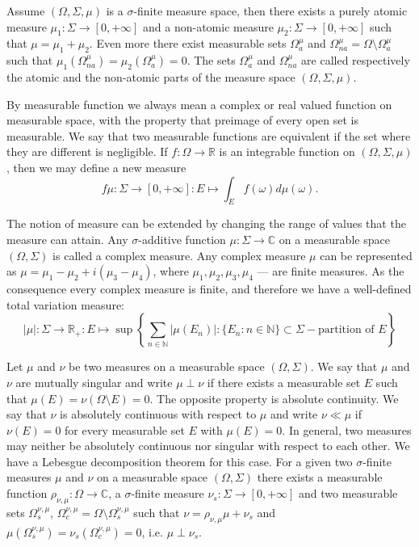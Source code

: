Assume $(\Omega,\Sigma,\mu)$ is a $\sigma$-finite measure space, then there
exists a purely atomic measure $\mu_1:\Sigma\to[0,+\infty]$ and a non-atomic
measure $\mu_2:\Sigma\to[0,+\infty]$ such that $\mu=\mu_1+\mu_2$. Even more
there exist measurable sets $\Omega_a^{\mu}$ and
$\Omega_{na}^{\mu}=\Omega\setminus \Omega_a^{\mu}$ such that
$\mu_1(\Omega_{na}^{\mu})=\mu_2(\Omega_a^{\mu})=0$. The sets $\Omega_a^{\mu}$
and $\Omega_{na}^{\mu}$ are called respectively the atomic and the non-atomic
parts of the measure space $(\Omega,\Sigma,\mu)$.

By measurable function we always mean a complex or real valued function on
measurable space, with the property that preimage of every open set is
measurable. We say that two measurable functions are equivalent if the set where
they are different is negligible. If $f:\Omega\to\mathbb{R}$ is an  integrable
function on $(\Omega,\Sigma,\mu)$, then we may define a new measure 
$$
f\mu:\Sigma\to[0,+\infty]:E\mapsto\int_{E}f(\omega)d\mu(\omega).
$$

The notion of measure can be extended by changing the range of values that the
measure can attain. Any $\sigma$-additive function $\mu:\Sigma\to\mathbb{C}$ on
a measurable space $(\Omega,\Sigma)$ is called a complex measure. Any complex
measure $\mu$ can be represented as $\mu=\mu_1-\mu_2+i(\mu_3-\mu_4)$, where
$\mu_1,\mu_2,\mu_3,\mu_4$ --- are finite measures. As the consequence every
complex measure is finite, and therefore we have a well-defined total variation
measure:
$$
|\mu|:\Sigma\to\mathbb{R}_+
:E\mapsto\sup\left \{\sum_{n\in\mathbb{N}}|\mu(E_n)|
: \{E_n:n\in\mathbb{N} \}\subset\Sigma -\mbox{partition of }E\right \}
$$

Let $\mu$ and $\nu$ be two measures on a measurable space $(\Omega,\Sigma)$. We
say that $\mu$ and $\nu$ are mutually singular and write $\mu\perp\nu$ if there
exists a measurable set $E$ such that $\mu(E)=\nu(\Omega\setminus E)=0$. The
opposite property is absolute continuity. We say that $\nu$ is absolutely
continuous with respect to $\mu$ and write $\nu\ll\mu$ if $\nu(E)=0$ for every
measurable set $E$ with $\mu(E)=0$. In general, two measures may neither be
absolutely continuous nor singular with respect to each other. We have a
Lebesgue decomposition theorem for this case. For a given two $\sigma$-finite
measures $\mu$ and $\nu$ on a measurable space $(\Omega,\Sigma)$ there exists a
measurable function $\rho_{\nu,\mu}:\Omega\to\mathbb{C}$, a $\sigma$-finite
measure $\nu_s:\Sigma\to[0,+\infty]$ and two measurable sets
$\Omega_s^{\nu,\mu}$, $\Omega_c^{\nu,\mu}=\Omega\setminus\Omega_s^{\nu,\mu}$
such that $\nu=\rho_{\nu,\mu}\mu+\nu_s$ and
$\mu(\Omega_s^{\nu,\mu})=\nu_s(\Omega_c^{\nu,\mu})=0$, i.e. $\mu\perp\nu_s$.


